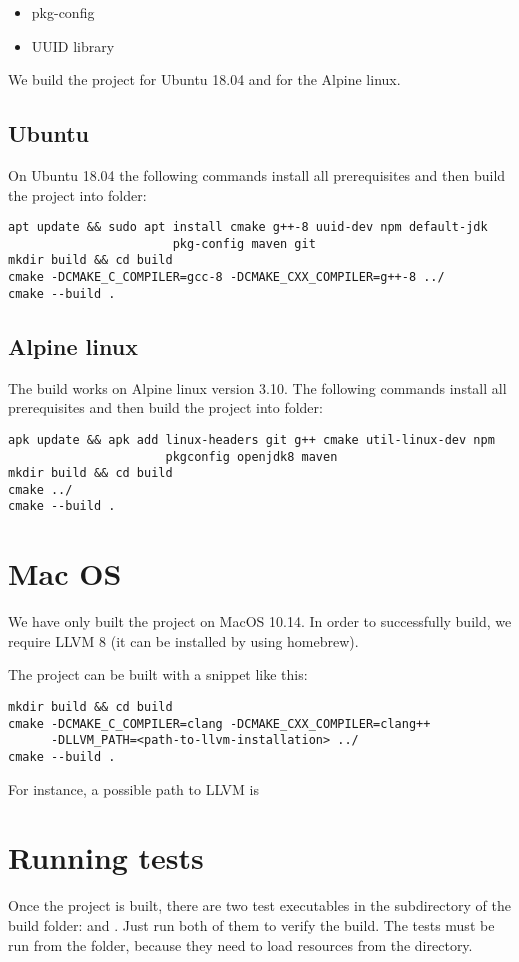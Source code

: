 \begin{itemize}
	\item pkg-config
	\item UUID library
\end{itemize}


We build the project for Ubuntu 18.04 and for the Alpine linux.
\subsection{Ubuntu}
On Ubuntu 18.04 the following commands install all prerequisites and then build the project into  folder:

\begin{verbatim}
apt update && sudo apt install cmake g++-8 uuid-dev npm default-jdk
                       pkg-config maven git
mkdir build && cd build
cmake -DCMAKE_C_COMPILER=gcc-8 -DCMAKE_CXX_COMPILER=g++-8 ../
cmake --build .
\end{verbatim}


\subsection{Alpine linux}

The build works on Alpine linux version 3.10. The following commands install all prerequisites and then build the project into  folder:
\begin{verbatim}
apk update && apk add linux-headers git g++ cmake util-linux-dev npm
                      pkgconfig openjdk8 maven
mkdir build && cd build
cmake ../
cmake --build .
\end{verbatim}


\section{Mac OS}
We have only built the project on MacOS 10.14. In order to successfully build, we require LLVM 8 (it can be installed by using homebrew).

The project can be built with a snippet like this:
\begin{verbatim}
mkdir build && cd build
cmake -DCMAKE_C_COMPILER=clang -DCMAKE_CXX_COMPILER=clang++
      -DLLVM_PATH=<path-to-llvm-installation> ../
cmake --build .
\end{verbatim}
For instance, a possible path to LLVM is 

\section{Running tests}
Once the project is built, there are two test executables in the  subdirectory of the build folder:  and . Just run both of them to verify the build. The tests must be run from the  folder, because they need to load resources from the  directory.


